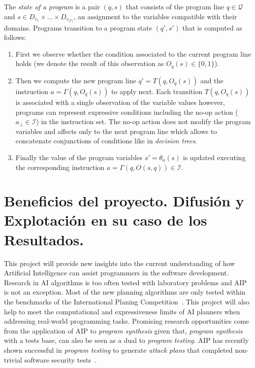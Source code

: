 \documentclass[10pt,a4paper]{paper}
\begin{document}
The {\em state of a program} is a pair $(q,s)$ that consists of the program line $q\in \mathcal{Q}$ and $s\in D_{v_1}\times \ldots \times D_{v_{|\mathcal{V}|}}$, an assignment to the variables compatible with their domains. Programs transition to a program state $(q',s')$ that is computed as follows:
\begin{enumerate}
\item First we observe whether the condition associated to the current program line holds (we denote the result of this observation as $O_q(s)\in \{0,1\}$). 
\item Then we compute the new program line $q'=T(q,O_q(s))$ and the instruction $a=\Gamma(q,O_q(s))$ to apply next. Each transition $T(q,O_q(s))$ is associated with a single observation of the variable values however, programs can represent expressive conditions including the no-op action ($a_{\bot}\in\mathcal{I}$) in the instruction set. The no-op action does not modify the program variables and affects only to the next program line which allows to concatenate conjunctions of conditions like in {\em decision trees}.
\item Finally the value of the program variables $s'=\theta_a(s)$ is updated executing the corresponding instruction $a=\Gamma(q,O(s,q))\in \mathcal{I}$.
\end{enumerate}
 



\section{Beneficios del proyecto. Difusión y Explotación en su caso de los Resultados.}
\label{subsec:beneficios}
This project will provide new insights into the current understanding of how Artificial Intelligence can assist programmers in the software development. Research in AI algorithms is too often tested with laboratory problems and AIP is not an exception. Most of the new planning algorithms are only tested within the benchmarks of the International Planing Competition~\cite{vallati:IPC:AI15}. This project will also help to meet the computational and expressiveness limits of AI planners when addressing real-world programming tasks. Promising research opportunities come from the application of AIP to {\em program synthesis} given that, {\em program synthesis} with a tests base, can also be seen as a dual to {\em program testing}. AIP has recently shown successful in {\em program testing} to generate {\em attack plans} that completed non-trivial software security tests~\cite{hoffmann2015simulated,steinmetz2016revisiting,shmaryahu2016constructing,steinmetz2016goal}.
\end{document}
